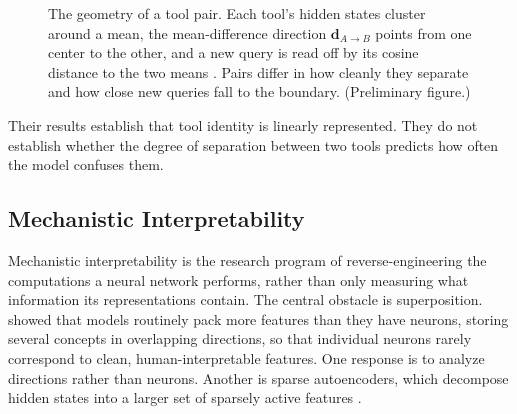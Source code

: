 \begin{figure}[htbp]
\centering
{}
\caption{The geometry of a tool pair. Each tool's hidden states cluster around a mean, the mean-difference direction $\mathbf{d}_{A \to B}$ points from one center to the other, and a new query is read off by its cosine distance to the two means \cite{wu2026linearly}. Pairs differ in how cleanly they separate and how close new queries fall to the boundary. (Preliminary figure.)}
\label{fig:toolgeometry}
\end{figure}


Their results establish that tool identity is linearly represented.
They do not establish whether the degree of separation between two tools predicts how often the model confuses them.

\subsection{Mechanistic Interpretability}
\label{sec:mechinterp}

Mechanistic interpretability is the research program of reverse-engineering the computations a neural network performs, rather than only measuring what information its representations contain.
The central obstacle is superposition.
\textcite{elhage2022superposition} showed that models routinely pack more features than they have neurons, storing several concepts in overlapping directions, so that individual neurons rarely correspond to clean, human-interpretable features.
One response is to analyze directions rather than neurons.
Another is sparse autoencoders, which decompose hidden states into a larger set of sparsely active features \cite{cunningham2023sae}.
\\

